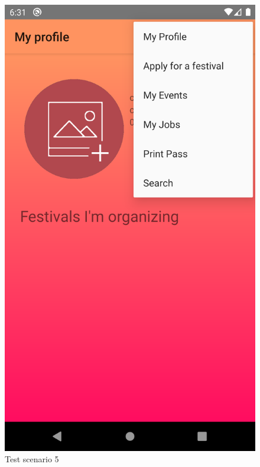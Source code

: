 			\begin{figure}[H]
				\includegraphics[width=\linewidth]{images/test_Screens/test_scenario_5-3.png}
				\caption{Test scenario 5}
				\label{fig:espresso_5_3}
			\end{figure}
	
